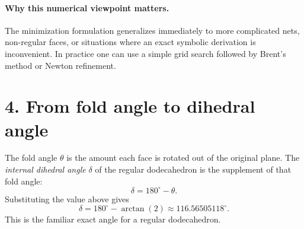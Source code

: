 \documentclass[11pt]{article}
\begin{document}
\paragraph{Why this numerical viewpoint matters.}
The minimization formulation generalizes immediately to more complicated nets, non-regular faces, or situations where an exact symbolic derivation is inconvenient. In practice one can use a simple grid search followed by Brent's method or Newton refinement.

\section*{4. From fold angle to dihedral angle}
The fold angle \(\theta\) is the amount each face is rotated out of the original plane. The \emph{internal dihedral angle} \(\delta\) of the regular dodecahedron is the supplement of that fold angle:
\[
\boxed{\delta = 180^\circ - \theta.}
\]
Substituting the value above gives
\[
\boxed{\delta = 180^\circ - \arctan(2) \approx 116.56505118^\circ.}
\]
This is the familiar exact angle for a regular dodecahedron.

\vspace{0.7em}
\noindent
{}
\end{document}
